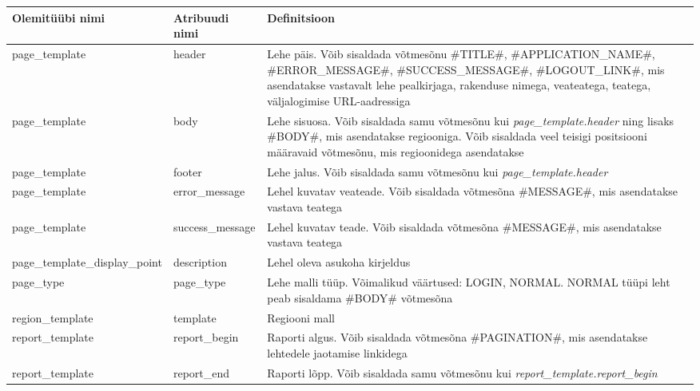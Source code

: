 \documentclass[a4paper,12pt]{article} %
\begin{document}
\begin{table}[H]
\centering
\begin{tabular}{|p{5cm}|p{5cm}|p{5cm}|}
\hline
\rowcolor{rowgray}
Olemitüübi nimi & Atribuudi nimi & Definitsioon \\ \hline
page\_template & header & Lehe päis. Võib sisaldada võtmesõnu \#TITLE\#, \#APPLICATION\_NAME\#, \#ERROR\_MESSAGE\#, \#SUCCESS\_MESSAGE\#, \#LOGOUT\_LINK\#, mis asendatakse vastavalt lehe pealkirjaga, rakenduse nimega, veateatega, teatega, väljalogimise URL-aadressiga \\ \hline
page\_template & body & Lehe sisuosa. Võib sisaldada samu võtmesõnu kui \textit{page\_template.header} ning lisaks  \#BODY\#, mis asendatakse regiooniga. Võib sisaldada veel teisigi positsiooni määravaid võtmesõnu, mis regioonidega asendatakse \\ \hline
page\_template & footer & Lehe jalus. Võib sisaldada samu võtmesõnu kui \textit{page\_template.header} \\ \hline
page\_template & error\_message & Lehel kuvatav veateade. Võib sisaldada võtmesõna \#MESSAGE\#, mis asendatakse vastava teatega \\ \hline
page\_template & success\_message & Lehel kuvatav teade. Võib sisaldada võtmesõna \#MESSAGE\#, mis asendatakse vastava teatega \\ \hline
page\_template\_display\_point & description & Lehel oleva asukoha kirjeldus \\ \hline
page\_type & page\_type & Lehe malli tüüp. Võimalikud väärtused: LOGIN, NORMAL. NORMAL tüüpi leht peab sisaldama \#BODY\# võtmesõna \\ \hline
region\_template & template & Regiooni mall \\ \hline
report\_template & report\_begin & Raporti algus. Võib sisaldada võtmesõna \#PAGINATION\#, mis asendatakse lehtedele jaotamise linkidega \\ \hline
report\_template & report\_end & Raporti lõpp. Võib sisaldada samu võtmesõnu kui \textit{report\_template.report\_begin} \\ \hline
\end{tabular}
\end{table}
\end{document}
